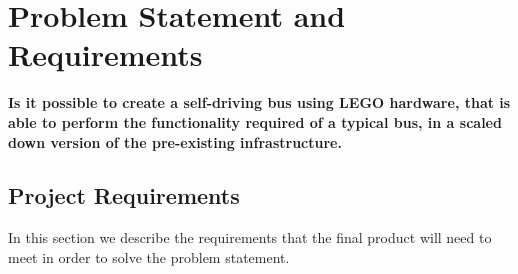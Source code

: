 \chapter{Problem Statement and Requirements}



\textbf{Is it possible to create a self-driving bus using LEGO hardware, that is able to perform the functionality required of a typical bus, in a scaled down version of the pre-existing infrastructure.}





\section{Project Requirements}  \label{Requirements}
In this section we describe the requirements that the final product will need to meet in order to solve the problem statement. %


